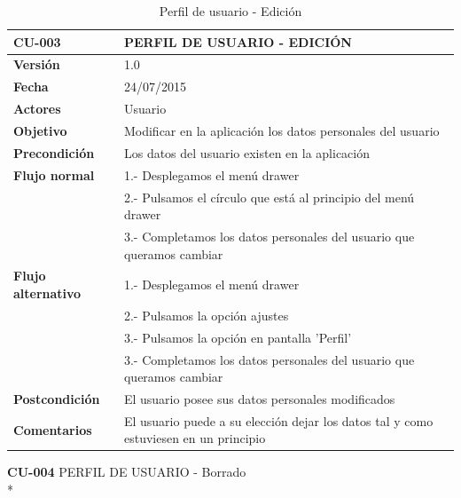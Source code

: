\documentclass[../pfc.tex]{subfiles}
\begin{document}
	\begin{table}[H]
		\centering
		\begin{tabular}[t]{|p{3cm}|p{9.5cm}|}
			\hline \textbf{CU-003} & \textbf{PERFIL DE USUARIO - EDICIÓN} \\*
			\hline\hline \textbf{Versión} & 1.0 \\*
			\hline\hline \textbf{Fecha} & 24/07/2015 \\*
			\hline\textbf{Actores} 	& Usuario\\*
			\hline \textbf{Objetivo} & Modificar en la aplicación los datos personales del usuario\\* 			
			\hline \textbf{Precondición} & Los datos del usuario existen en la aplicación \\* 
			\hline \textbf{Flujo normal} & 1.- Desplegamos el menú drawer\\* 
			& 2.- Pulsamos el círculo que está al principio del menú drawer\\*	
			& 3.- Completamos los datos personales del usuario que queramos cambiar\\*	
			\hline \textbf{Flujo alternativo} & 1.- Desplegamos el menú drawer\\* 
			& 2.- Pulsamos la opción ajustes \\*	
			& 3.- Pulsamos la opción en pantalla 'Perfil' \\*	
			& 3.- Completamos los datos personales del usuario que queramos cambiar\\*	
			\hline \textbf{Postcondición} & El usuario posee sus datos personales modificados\\* 
			\hline \textbf{Comentarios}   & El usuario puede a su elección dejar los datos tal y como estuviesen en un principio\\*
			\hline
		\end{tabular}
		\caption{Perfil de usuario - Edición}
		\label{tabla:caso003}

	\end{table}
		
	\textbf{CU-004}	PERFIL DE USUARIO - Borrado\\*
\end{document}
